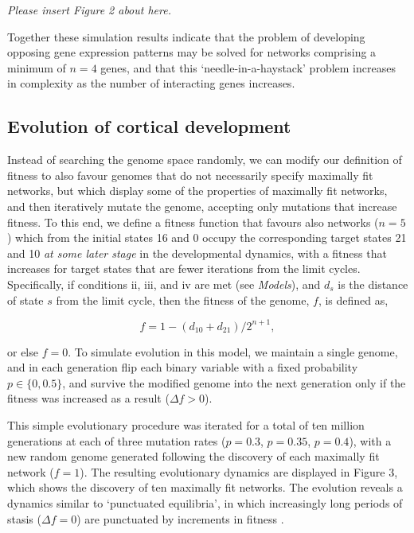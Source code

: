 \documentclass[10pt,letterpaper]{article}
\begin{document}
\vspace{1em}\emph{\noindent Please insert Figure 2 about here.}\vspace{1em}

Together these simulation results indicate that the problem of developing opposing gene expression patterns may be solved for networks comprising a minimum of $n=4$ genes, and that this `needle-in-a-haystack' problem increases in complexity as the number of interacting genes increases.

\subsection*{Evolution of cortical development}

Instead of searching the genome space randomly, we can modify our definition of fitness to also favour genomes that do not necessarily specify maximally fit networks, but which display some of the properties of maximally fit networks, and then iteratively mutate the genome, accepting only mutations that increase fitness. To this end, we define a fitness function that favours also networks ($n=5$) which from the initial states 16 and 0 occupy the corresponding target states 21 and 10 \emph{at some later stage} in the developmental dynamics, with a fitness that increases for target states that are fewer iterations from the limit cycles. Specifically, if conditions ii, iii, and iv are met (see \emph{Models}), and $d_s$ is the distance of state $s$ from the limit cycle, then the fitness of the genome, $f$, is defined as,

\begin{equation}
f=1-\left(d_{10}+d_{21}\right)/2^{n+1},
\end{equation}

\noindent or else $f=0$. To simulate evolution in this model, we maintain a single genome, and in each generation flip each binary variable with a fixed probability $p\in\{0,0.5\}$, and survive the modified genome into the next generation only if the fitness was increased as a result ($\Delta f>0$). 

This simple evolutionary procedure was iterated for a total of ten million generations at each of three mutation rates ($p=0.3$, $p=0.35$, $p=0.4$), with a new random genome generated following the discovery of each maximally fit network ($f=1$). The resulting evolutionary dynamics are displayed in Figure 3, which shows the discovery of ten maximally fit networks. The evolution reveals a dynamics similar to `punctuated equilibria', in which increasingly long periods of stasis ($\Delta f=0$) are punctuated by increments in fitness \cite{Gould1977,Bak1996}. 
\end{document}
